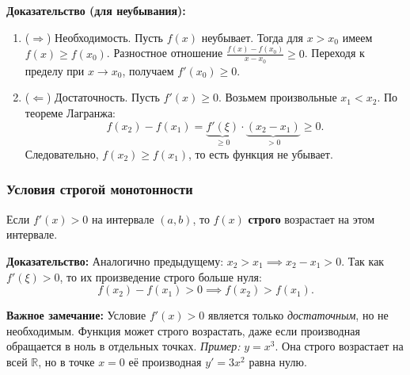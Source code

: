 \textbf{Доказательство (для неубывания):}
\begin{enumerate}
    \item ($\Rightarrow$) Необходимость.
    Пусть $f(x)$ неубывает. Тогда для $x > x_0$ имеем $f(x) \ge f(x_0)$.
    Разностное отношение $\frac{f(x) - f(x_0)}{x - x_0} \ge 0$.
    Переходя к пределу при $x \to x_0$, получаем $f'(x_0) \ge 0$.
    
    \item ($\Leftarrow$) Достаточность.
    Пусть $f'(x) \ge 0$. Возьмем произвольные $x_1 < x_2$.
    По теореме Лагранжа:
    \[ f(x_2) - f(x_1) = \underbrace{f'(\xi)}_{\ge 0} \cdot \underbrace{(x_2 - x_1)}_{> 0} \ge 0. \]
    Следовательно, $f(x_2) \ge f(x_1)$, то есть функция не убывает.
\end{enumerate}

\subsubsection*{Условия строгой монотонности}

\begin{tcolorbox}[title=Достаточное условие строгого возрастания]
    Если $f'(x) > 0$ на интервале $(a, b)$, то $f(x)$ \textbf{строго} возрастает на этом интервале.
\end{tcolorbox}

\textbf{Доказательство:}
Аналогично предыдущему: $x_2 > x_1 \implies x_2 - x_1 > 0$.
Так как $f'(\xi) > 0$, то их произведение строго больше нуля:
\[ f(x_2) - f(x_1) > 0 \implies f(x_2) > f(x_1). \]

\textbf{Важное замечание:}
Условие $f'(x) > 0$ является только \textit{достаточным}, но не необходимым.
Функция может строго возрастать, даже если производная обращается в ноль в отдельных точках.
\textit{Пример:} $y = x^3$. Она строго возрастает на всей $\mathbb{R}$, но в точке $x=0$ её производная $y'=3x^2$ равна нулю.

